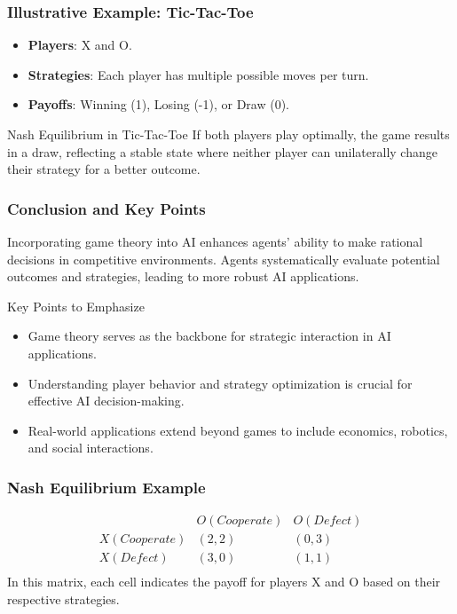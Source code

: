 \documentclass[aspectratio=169]{beamer}
\begin{document}
\begin{frame}[fragile]
    \frametitle{Illustrative Example: Tic-Tac-Toe}
    \begin{itemize}
        \item \textbf{Players}: X and O.
        \item \textbf{Strategies}: Each player has multiple possible moves per turn.
        \item \textbf{Payoffs}: Winning (1), Losing (-1), or Draw (0).
    \end{itemize}
    \begin{block}{Nash Equilibrium in Tic-Tac-Toe}
        If both players play optimally, the game results in a draw, reflecting a stable state where neither player can unilaterally change their strategy for a better outcome.
    \end{block}
\end{frame}

\begin{frame}[fragile]
    \frametitle{Conclusion and Key Points}
    Incorporating game theory into AI enhances agents' ability to make rational decisions in competitive environments. Agents systematically evaluate potential outcomes and strategies, leading to more robust AI applications.
    
    \begin{block}{Key Points to Emphasize}
        \begin{itemize}
            \item Game theory serves as the backbone for strategic interaction in AI applications.
            \item Understanding player behavior and strategy optimization is crucial for effective AI decision-making.
            \item Real-world applications extend beyond games to include economics, robotics, and social interactions.
        \end{itemize}
    \end{block}
\end{frame}

\begin{frame}[fragile]
    \frametitle{Nash Equilibrium Example}
    \begin{equation}
    \begin{array}{c|c|c}
    & O (Cooperate) & O (Defect) \\
    \hline
    X (Cooperate) & (2,2) & (0,3) \\
    \hline
    X (Defect) & (3,0) & (1,1) \\
    \end{array}
    \end{equation}
    In this matrix, each cell indicates the payoff for players X and O based on their respective strategies.
\end{frame}
\end{document}
